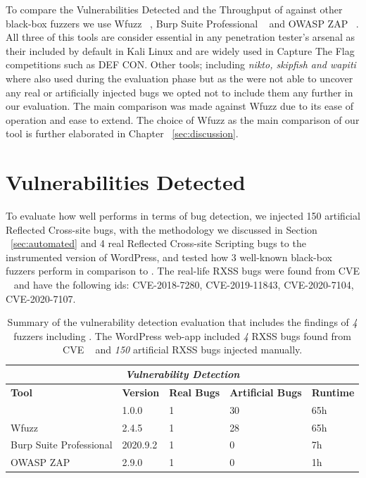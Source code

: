 To compare the Vulnerabilities Detected and the Throughput of \pname{} against other black-box fuzzers we use Wfuzz ~\cite{wfuzz}, Burp Suite Professional ~\cite{burp} and OWASP ZAP ~\cite{ owaspzap}. All three of this tools are consider essential in any penetration tester's arsenal as their included by default in Kali Linux and are widely used in Capture The Flag competitions such as DEF CON. Other tools; including \emph{nikto, skipfish and wapiti} where also used during the evaluation phase but as the were not able to uncover any real or artificially injected bugs we opted not to include them any further in our evaluation. The main comparison was made against Wfuzz due to its ease of operation and ease to extend. The choice of Wfuzz as the main comparison of our tool is further elaborated in Chapter ~\ref{sec:discussion}.

\section{Vulnerabilities Detected}
To evaluate how well \pname{} performs in terms of bug detection, we injected 150 artificial  Reflected Cross-site bugs, with the methodology we discussed in Section ~\ref{sec:automated} and 4 real Reflected Cross-site Scripting bugs to the instrumented version of WordPress, and tested how 3 well-known black-box fuzzers perform in comparison to \pname{}. The real-life RXSS bugs were found from CVE ~\cite{cve} and have the following ids: CVE-2018-7280, CVE-2019-11843, CVE-2020-7104, CVE-2020-7107.

\begin{table}[ht]
\centering
 \begin{tabular}{@{}|l|l|l|l|l|@{}}
 \hline
  \multicolumn{5}{|c|}{\textit{\textbf{Vulnerability Detection}}} \\
 \hline
 \textbf{Tool} & \textbf{Version} & \textbf{Real Bugs} & \textbf{Artificial Bugs} & \textbf{Runtime} \\ 
 \hline\hline
 \pname{} & 1.0.0 & 1 & 30 & 65h  \\ 
 \hline
 Wfuzz & 2.4.5 & 1 & 28 & 65h  \\ 
 \hline
 Burp Suite Professional & 2020.9.2 & 1 & 0 & 7h \\ 
 \hline
 OWASP ZAP  & 2.9.0 & 1 & 0 & 1h  \\
 \hline
 \end{tabular}
 \caption{Summary of the vulnerability detection evaluation that includes the findings of \emph{4} fuzzers including \pname{}. The WordPress web-app included \emph{4} RXSS bugs found from CVE {~\cite{cve}} and \emph{150} artificial RXSS bugs injected manually.}

 \label{tools_table}
\end{table}

